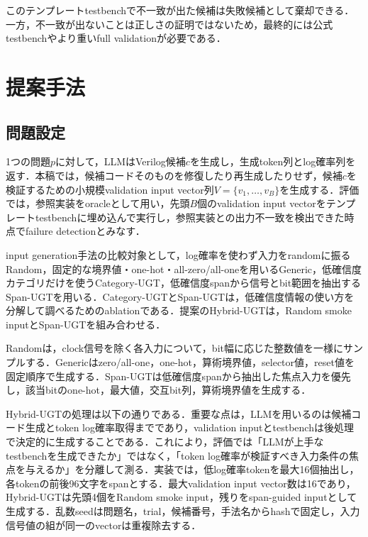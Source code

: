 \documentclass[submit,techrep,noauthor]{ipsj}
\begin{document}
このテンプレートtestbenchで不一致が出た候補は失敗候補として棄却できる．一方，不一致が出ないことは正しさの証明ではないため，最終的には公式testbenchやより重いfull validationが必要である．

\section{提案手法}\label{sec:method}

\subsection{問題設定}

1つの問題$p$に対して，LLMはVerilog候補$c$を生成し，生成token列とlog確率列を返す．本稿では，候補コードそのものを修復したり再生成したりせず，候補$c$を検証するための小規模validation input vector列$V=\{v_1,\ldots,v_B\}$を生成する．評価では，参照実装をoracleとして用い，先頭$B$個のvalidation input vectorをテンプレートtestbenchに埋め込んで実行し，参照実装との出力不一致を検出できた時点でfailure detectionとみなす．

input generation手法の比較対象として，log確率を使わず入力をrandomに振るRandom，固定的な境界値・one-hot・all-zero/all-oneを用いるGeneric，低確信度カテゴリだけを使うCategory-UGT，低確信度spanから信号とbit範囲を抽出するSpan-UGTを用いる．Category-UGTとSpan-UGTは，低確信度情報の使い方を分解して調べるためのablationである．提案のHybrid-UGTは，Random smoke inputとSpan-UGTを組み合わせる．

Randomは，clock信号を除く各入力について，bit幅に応じた整数値を一様にサンプルする．Genericはzero/all-one，one-hot，算術境界値，selector値，reset値を固定順序で生成する．Span-UGTは低確信度spanから抽出した焦点入力を優先し，該当bitのone-hot，最大値，交互bit列，算術境界値を生成する．

Hybrid-UGTの処理は以下の通りである．重要な点は，LLMを用いるのは候補コード生成とtoken log確率取得までであり，validation inputとtestbenchは後処理で決定的に生成することである．これにより，評価では「LLMが上手なtestbenchを生成できたか」ではなく，「token log確率が検証すべき入力条件の焦点を与えるか」を分離して測る．実装では，低log確率tokenを最大16個抽出し，各tokenの前後96文字をspanとする．最大validation input vector数は16であり，Hybrid-UGTは先頭4個をRandom smoke input，残りをspan-guided inputとして生成する．乱数seedは問題名，trial，候補番号，手法名からhashで固定し，入力信号値の組が同一のvectorは重複除去する．
\end{document}
